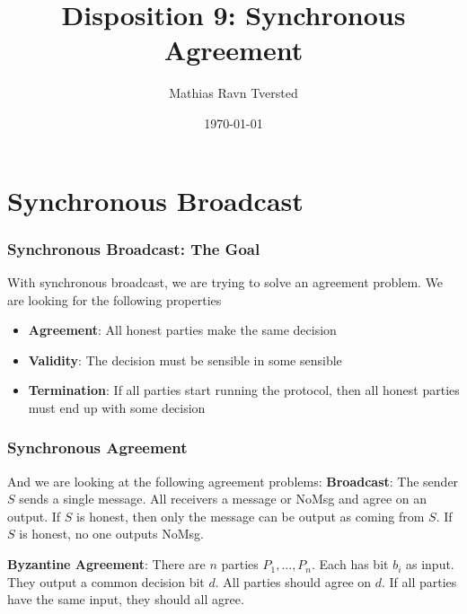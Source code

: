 
\title{Disposition 9: Synchronous Agreement}   
\author{Mathias Ravn Tversted} 
\date{\today} 












\frame{\titlepage} 



\section{Synchronous Broadcast}
    \begin{frame}
        \frametitle{Synchronous Broadcast: The Goal}
            With synchronous broadcast, we are trying to solve an agreement problem. We are looking for the following properties
            \begin{itemize}
                \item \textbf{Agreement}: All honest parties make the same decision
                \item \textbf{Validity}: The decision must be sensible in some sensible
                \item \textbf{Termination}: If all parties start running the protocol, then all honest parties must end up with some decision
            \end{itemize}
    \end{frame}
\begin{frame}
    \frametitle{Synchronous Agreement}  
        And we are looking at the following agreement problems:
        \textbf{Broadcast}: The sender $S$ sends a single message. All receivers a message or NoMsg and agree on an output. If $S$ is honest, then only the message can be output as coming from $S$. If $S$ is honest, no one outputs NoMsg. 
        
        \textbf{Byzantine Agreement}: There are $n$ parties $P_1, ..., P_n$. Each has bit $b_i$ as input. They output a common decision bit $d$. All parties should agree on $d$. If all parties have the same input, they should all agree. 
\end{frame}

